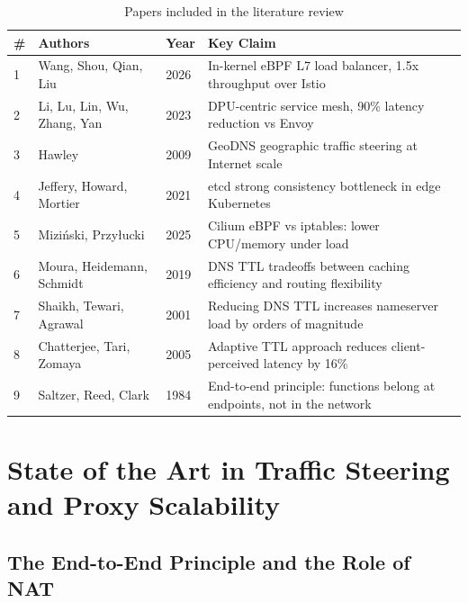 \documentclass[a4paper,11pt]{article}
\begin{document}
\begin{table}[H]
\centering
\small
\begin{tabular}{lllp{6cm}}
\toprule
\textbf{\#} & \textbf{Authors} & \textbf{Year} & \textbf{Key Claim} \\
\midrule
1 & Wang, Shou, Qian, Liu          & 2026 & In-kernel eBPF L7 load balancer, 1.5x throughput over Istio \cite{wangXLBHighPerformance2026} \\
2 & Li, Lu, Lin, Wu, Zhang, Yan    & 2023 & DPU-centric service mesh, 90\% latency reduction vs Envoy \cite{liFlatProxyDPUcentricService2023} \\
3 & Hawley                         & 2009 & GeoDNS geographic traffic steering at Internet scale \cite{hawleyGeoDNSGeographicallyAware} \\
4 & Jeffery, Howard, Mortier       & 2021 & etcd strong consistency bottleneck in edge Kubernetes \cite{jefferyRearchitectingKubernetesEdge2021} \\
5 & Miziński, Przyłucki            & 2025 & Cilium eBPF vs iptables: lower CPU/memory under load \cite{mizinskiImpactUsingEBPF2025} \\
6 & Moura, Heidemann, Schmidt      & 2019 & DNS TTL tradeoffs between caching efficiency and routing flexibility \cite{mouraCacheMeIf2019} \\
7 & Shaikh, Tewari, Agrawal        & 2001 & Reducing DNS TTL increases nameserver load by orders of magnitude \cite{shaikhEffectivenessDNSbasedServer2001} \\
8 & Chatterjee, Tari, Zomaya       & 2005 & Adaptive TTL approach reduces client-perceived latency by 16\% \cite{chatterjeeTaskbasedAdaptiveTTL2005} \\
9 & Saltzer, Reed, Clark           & 1984 & End-to-end principle: functions belong at endpoints, not in the network \cite{saltzerEndtoendArgumentsSystem1984} \\
\bottomrule
\end{tabular}
\caption{Papers included in the literature review}
\label{tab:papers}
\end{table}

\section{State of the Art in Traffic Steering and Proxy Scalability}

\subsection{The End-to-End Principle and the Role of NAT}
\end{document}
